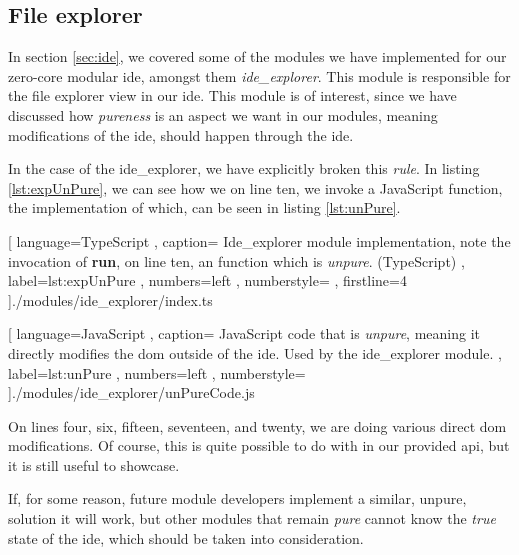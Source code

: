 

\subsection{File explorer}

In section \ref{sec:ide}, we covered some of the modules we have implemented for
our zero-core modular \gls*{ide}, amongst them \textit{ide\_explorer}. This
module is responsible for the file explorer view in our \gls*{ide}. This module
is of interest, since we have discussed how \textit{pureness} is an aspect we
want in our modules, meaning modifications of the \gls*{ide}, should happen
through the \gls*{ide}.

In the case of the ide\_explorer, we have explicitly broken this \textit{rule}.
In listing \ref{lst:expUnPure}, we can see how we on line ten, we invoke
a JavaScript function, the implementation of which, can be seen in listing
\ref{lst:unPure}.

\begin{code}[H]
  
    [ language=TypeScript
    , caption={
      Ide\_explorer module implementation, note the invocation of \textbf{run},
      on line ten, an function which is \textit{unpure}. (TypeScript)
    }
    , label=lst:expUnPure
    , numbers=left
    , numberstyle=\tiny\color{gray}
    , firstline=4
    ]{./modules/ide\_explorer/index.ts}
\end{code}

\begin{code}[H]
  
    [ language=JavaScript
    , caption={
      JavaScript code that is \textit{unpure}, meaning it directly modifies the
      \gls*{dom} outside of the \gls*{ide}. Used by the ide\_explorer module.
    }
    , label=lst:unPure
    , numbers=left
    , numberstyle=\tiny\color{gray}
    ]{./modules/ide\_explorer/unPureCode.js}
\end{code}

On lines four, six, fifteen, seventeen, and twenty, we are doing various direct
\gls*{dom} modifications. Of course, this is quite possible to do with in our
provided \gls*{api}, but it is still useful to showcase.

If, for some reason, future module developers implement a similar, unpure,
solution it will work, but other modules that remain \textit{pure} cannot
know the \textit{true} state of the \gls*{ide}, which should be taken into
consideration.


